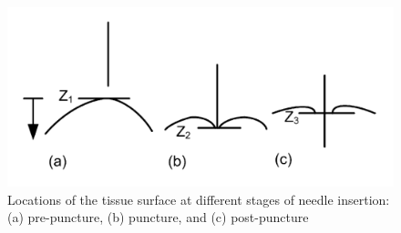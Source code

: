 \begin{figure}
	\includegraphics[width=\textwidth]{images/puncture_stage.png}
	\caption[Locations of the tissue surface at each puncturing stage]{Locations of the tissue surface at different stages of needle insertion: (a) pre-puncture, (b) puncture, and (c) post-puncture  \cite{Maurin2004}}
	\label{fig:punct_stage}
\end{figure}

